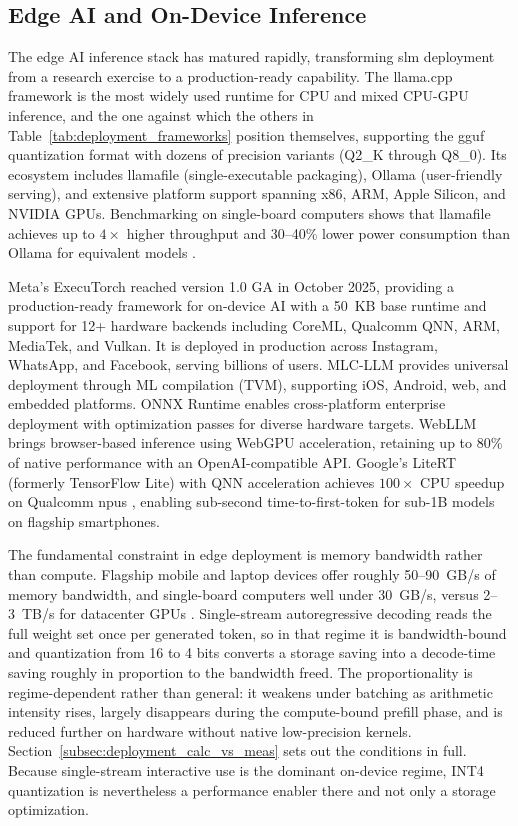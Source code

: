 \subsection{Edge AI and On-Device Inference}
\label{subsec:background_edge_ai}
The edge AI inference stack has matured rapidly, transforming \gls{slm} deployment from a research exercise to a production-ready capability. The llama.cpp framework \citep{gerganov2023llamacpp} is the most widely used runtime for CPU and mixed CPU-GPU inference, and the one against which the others in Table~\ref{tab:deployment_frameworks} position themselves, supporting the \gls{gguf} quantization format with dozens of precision variants (Q2\_K through Q8\_0). Its ecosystem includes llamafile (single-executable packaging), Ollama (user-friendly serving), and extensive platform support spanning x86, ARM, Apple Silicon, and NVIDIA GPUs. Benchmarking on single-board computers shows that llamafile achieves up to $4\times$ higher throughput and 30--40\% lower power consumption than Ollama for equivalent models \citep{costa2025sbc}.

Meta's ExecuTorch \citep{meta2024executorch} reached version 1.0 GA in October 2025, providing a production-ready framework for on-device AI with a 50~KB base runtime and support for 12+ hardware backends including CoreML, Qualcomm QNN, ARM, MediaTek, and Vulkan. It is deployed in production across Instagram, WhatsApp, and Facebook, serving billions of users. MLC-LLM \citep{mlc2024} provides universal deployment through ML compilation (TVM), supporting iOS, Android, web, and embedded platforms. ONNX Runtime \citep{microsoft2019onnx} enables cross-platform enterprise deployment with optimization passes for diverse hardware targets. WebLLM \citep{webllm2024} brings browser-based inference using WebGPU acceleration, retaining up to 80\% of native performance with an OpenAI-compatible API. Google's LiteRT (formerly TensorFlow Lite) with QNN acceleration achieves $100\times$ CPU speedup on Qualcomm \glspl{npu} \citep{google2025litert}, enabling sub-second time-to-first-token for sub-1B models on flagship smartphones.

The fundamental constraint in edge deployment is memory bandwidth rather than compute. Flagship mobile and laptop devices offer roughly 50--90~GB/s of memory bandwidth, and single-board computers well under 30~GB/s, versus 2--3~TB/s for datacenter GPUs \citep{xu2024device}. Single-stream autoregressive decoding reads the full weight set once per generated token, so in that regime it is bandwidth-bound and quantization from 16 to 4 bits converts a storage saving into a decode-time saving roughly in proportion to the bandwidth freed. The proportionality is regime-dependent rather than general: it weakens under batching as arithmetic intensity rises, largely disappears during the compute-bound prefill phase, and is reduced further on hardware without native low-precision kernels. Section~\ref{subsec:deployment_calc_vs_meas} sets out the conditions in full. Because single-stream interactive use is the dominant on-device regime, INT4 quantization is nevertheless a performance enabler there and not only a storage optimization.


